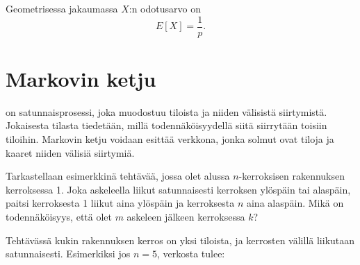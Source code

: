 Geometrisessa jakaumassa $X$:n odotusarvo on
\[E[X]=\frac{1}{p}.\]

\section{Markovin ketju}


 on satunnaisprosessi,
joka muodostuu tiloista ja niiden välisistä siirtymistä.
Jokaisesta tilasta tiedetään, millä todennäköisyydellä
siitä siirrytään toisiin tiloihin.
Markovin ketju voidaan esittää verkkona,
jonka solmut ovat tiloja
ja kaaret niiden välisiä siirtymiä.

Tarkastellaan esimerkkinä tehtävää,
jossa olet alussa $n$-kerroksisen
rakennuksen kerroksessa 1.
Joka askeleella liikut satunnaisesti
kerroksen ylöspäin tai alaspäin,
paitsi kerroksesta 1 liikut aina ylöspäin
ja kerroksesta $n$ aina alaspäin.
Mikä on todennäköisyys, että olet $m$
askeleen jälkeen kerroksessa $k$?

Tehtävässä kukin rakennuksen kerros
on yksi tiloista, ja kerrosten välillä liikutaan
satunnaisesti.
Esimerkiksi jos $n=5$, verkosta tulee:

\begin{center}
\end{center}

